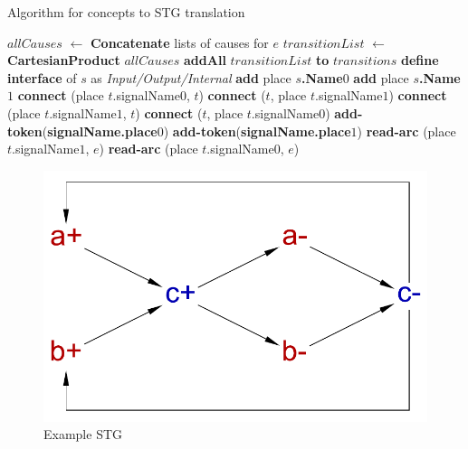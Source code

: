 \documentclass[british, 10pt, conference, compsocconf]{IEEEtran}
\begin{document}
\begin{algorithm}[H]
\begin{algorithmic}[1]
\caption{Algorithm for concepts to STG translation\label{alg:translation}}
  \State $allCauses$ $\leftarrow$ \textbf{Concatenate} lists of causes for $e$ \label{alg:list}
  \State $transitionList$ $\leftarrow$ \textbf{CartesianProduct} $allCauses$
  \State \textbf{addAll} $transitionList$ \textbf{to} $transitions$
\EndFor
{}
  \State \textbf{define interface} of $s$ as \emph{Input/Output/Internal}
  \State \textbf{add} place \textbf{$s$.Name}$0$
  \State \textbf{add} place \textbf{$s$.Name}$1$
      \State \textbf{connect} (place $t$.signalName$0$, $t$)
      \State \textbf{connect} ($t$, place $t$.signalName$1$)
      \State \textbf{connect} (place $t$.signalName$1$, $t$)
      \State \textbf{connect} ($t$, place $t$.signalName$0$)
    \EndIf
  \EndFor
\EndFor
{}
    \State \textbf{add-token}(\textbf{signalName.place}$0$)
    \State \textbf{add-token}(\textbf{signalName.place}$1$)
  \EndIf
\EndFor
{}
      \State \textbf{read-arc} (place $t$.signalName$1$, $e$)
    \EndFor
      \State \textbf{read-arc} (place $t$.signalName$0$, $e$)
    \EndFor
  \EndIf
\EndFor
\end{algorithmic}
\end{algorithm}

\begin{figure}[h]
\vspace{-3mm}
\begin{centering}
\includegraphics[scale=0.3]{Images/cElement-stg.pdf}
\par\end{centering}
\protect\caption{\label{fig:cElement-stg} Example STG}
\vspace{-3mm}
\end{figure}
\end{document}
